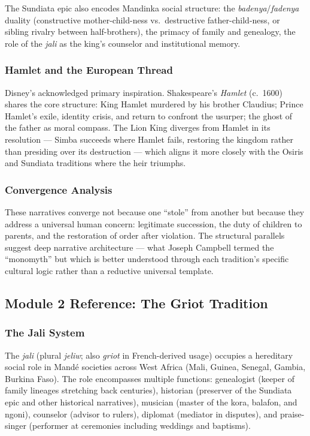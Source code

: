 \documentclass[11pt,letterpaper]{article}
\begin{document}
The Sundiata epic also encodes Mandinka social structure: the \textit{badenya}/\textit{fadenya} duality (constructive mother-child-ness vs.\ destructive father-child-ness, or sibling rivalry between half-brothers), the primacy of family and genealogy, the role of the \textit{jali} as the king's counselor and institutional memory.

\subsubsection{Hamlet and the European Thread}

Disney's acknowledged primary inspiration. Shakespeare's \textit{Hamlet} (c.~1600) shares the core structure: King Hamlet murdered by his brother Claudius; Prince Hamlet's exile, identity crisis, and return to confront the usurper; the ghost of the father as moral compass. The Lion King diverges from Hamlet in its resolution --- Simba succeeds where Hamlet fails, restoring the kingdom rather than presiding over its destruction --- which aligns it more closely with the Osiris and Sundiata traditions where the heir triumphs.

\subsubsection{Convergence Analysis}

These narratives converge not because one ``stole'' from another but because they address a universal human concern: legitimate succession, the duty of children to parents, and the restoration of order after violation. The structural parallels suggest deep narrative architecture --- what Joseph Campbell termed the ``monomyth'' but which is better understood through each tradition's specific cultural logic rather than a reductive universal template.

\subsection{Module 2 Reference: The Griot Tradition}

\subsubsection{The Jali System}

The \textit{jali} (plural \textit{jeliw}; also \textit{griot} in French-derived usage) occupies a hereditary social role in Mand\'{e} societies across West Africa (Mali, Guinea, Senegal, Gambia, Burkina Faso). The role encompasses multiple functions: genealogist (keeper of family lineages stretching back centuries), historian (preserver of the Sundiata epic and other historical narratives), musician (master of the kora, balafon, and ngoni), counselor (advisor to rulers), diplomat (mediator in disputes), and praise-singer (performer at ceremonies including weddings and baptisms).
\end{document}
